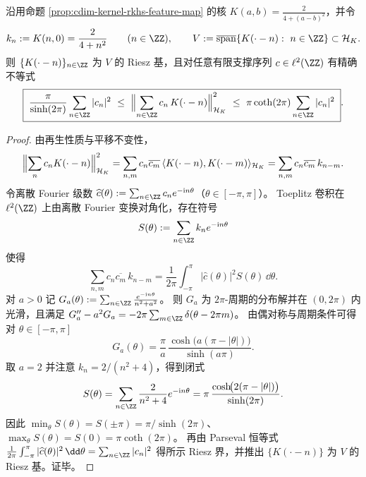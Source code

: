 \begin{proposition}\label{prop:cdim-kernel-integer-translate-riesz-bounds}
沿用命题 \ref{prop:cdim-kernel-rkhs-feature-map} 的核 \(K(a,b)=\frac{2}{4+(a-b)^2}\)，并令
\[
k_n:=K(n,0)=\frac{2}{4+n^2}\qquad(n\in\ZZ),
\qquad
V:=\overline{\mathrm{span}}\{K(\cdot-n):\ n\in\ZZ\}\subset\mathcal H_K.
\]
则 \(\{K(\cdot-n)\}_{n\in\ZZ}\) 为 \(V\) 的 Riesz 基，且对任意有限支撑序列 \(c\in\ell^2(\ZZ)\) 有精确不等式
\[
\boxed{\;
\frac{\pi}{\sinh(2\pi)}\sum_{n\in\ZZ}|c_n|^2
\ \le\
\Bigl\|\sum_{n\in\ZZ}c_n\,K(\cdot-n)\Bigr\|_{\mathcal H_K}^2
\ \le\
\pi\coth(2\pi)\sum_{n\in\ZZ}|c_n|^2\; }.
\]
\end{proposition}
\begin{proof}
由再生性质与平移不变性，
\[
\Bigl\|\sum_{n}c_nK(\cdot-n)\Bigr\|_{\mathcal H_K}^2
=\sum_{n,m}c_n\overline{c_m}\,\langle K(\cdot-n),K(\cdot-m)\rangle_{\mathcal H_K}
=\sum_{n,m}c_n\overline{c_m}\,k_{n-m}.
\]
令离散 Fourier 级数 \(\widehat c(\theta):=\sum_{n\in\ZZ}c_ne^{-\mathrm{i}n\theta}\)（\(\theta\in[-\pi,\pi]\)）。
Toeplitz 卷积在 \(\ell^2(\ZZ)\) 上由离散 Fourier 变换对角化，存在符号
\[
S(\theta):=\sum_{n\in\ZZ}k_ne^{-\mathrm{i}n\theta}
\]
使得
\[
\sum_{n,m}c_n\overline{c_m}\,k_{n-m}
=\frac{1}{2\pi}\int_{-\pi}^{\pi}|\widehat c(\theta)|^2S(\theta)\,\dd\theta.
\]
对 \(a>0\) 记
\(
G_a(\theta):=\sum_{n\in\ZZ}\frac{e^{-\mathrm{i}n\theta}}{n^2+a^2}
\)。
则 \(G_a\) 为 \(2\pi\)-周期的分布解并在 \((0,2\pi)\) 内光滑，且满足
\(
G_a''-a^2G_a=-2\pi\sum_{m\in\ZZ}\delta(\theta-2\pi m)
\)。
由偶对称与周期条件可得对 \(\theta\in[-\pi,\pi]\)
\[
G_a(\theta)=\frac{\pi}{a}\,\frac{\cosh\!\bigl(a(\pi-|\theta|)\bigr)}{\sinh(a\pi)}.
\]
取 \(a=2\) 并注意 \(k_n=2/(n^2+4)\)，得到闭式
\[
S(\theta)=\sum_{n\in\ZZ}\frac{2}{n^2+4}e^{-\mathrm{i}n\theta}
=\pi\,\frac{\cosh\!\bigl(2(\pi-|\theta|)\bigr)}{\sinh(2\pi)}.
\]
因此
\(
\min_{\theta}S(\theta)=S(\pm\pi)=\pi/\sinh(2\pi)
\)、
\(
\max_{\theta}S(\theta)=S(0)=\pi\coth(2\pi)
\)。
再由 Parseval 恒等式
\(
\frac{1}{2\pi}\int_{-\pi}^{\pi}|\widehat c(\theta)|^2\,\dd\theta=\sum_{n\in\ZZ}|c_n|^2
\)
得所示 Riesz 界，并推出 \(\{K(\cdot-n)\}\) 为 \(V\) 的 Riesz 基。证毕。
\end{proof}

